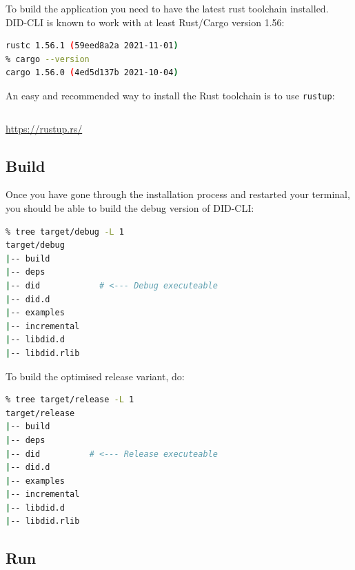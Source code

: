 To build the application you need to have the latest rust toolchain
installed. DID-CLI is known to work with at least Rust/Cargo version
1.56:

\begin{lstlisting}[language=bash]
% rustc --version
rustc 1.56.1 (59eed8a2a 2021-11-01)
% cargo --version
cargo 1.56.0 (4ed5d137b 2021-10-04)
\end{lstlisting}

An easy and recommended way to install the Rust toolchain is to use
\lstinline!rustup!:

\begin{lstlisting}[language=bash]
% curl --proto '=https' --tlsv1.2 -sSf https://sh.rustup.rs | sh
\end{lstlisting}

\url{https://rustup.rs/}

\hypertarget{build}{%
\subsection{Build}\label{build}}

Once you have gone through the installation process and restarted your
terminal, you should be able to build the debug version of DID-CLI:

\begin{lstlisting}[language=bash]
% cargo build
% tree target/debug -L 1  
target/debug
|-- build
|-- deps
|-- did            # <--- Debug executeable
|-- did.d
|-- examples
|-- incremental
|-- libdid.d
|-- libdid.rlib
\end{lstlisting}

To build the optimised release variant, do:

\begin{lstlisting}[language=bash]
% cargo build --release
% tree target/release -L 1
target/release
|-- build
|-- deps
|-- did          # <--- Release executeable
|-- did.d
|-- examples
|-- incremental
|-- libdid.d
|-- libdid.rlib
\end{lstlisting}




\pagebreak




\hypertarget{run-1}{%
\subsection{Run}\label{run-1}}

